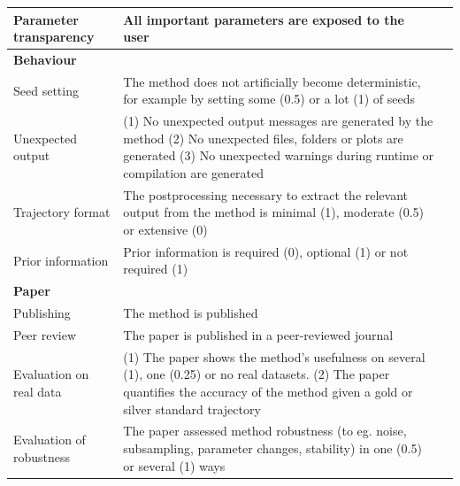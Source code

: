 \begin{table}
\begin{tabular}{p{3.5cm}p{9cm}p{2.5cm}}
		Parameter transparency & All important parameters are exposed to the user & \cite{taschuk_tensimplerules_2017}\\
		
		\midrule
		\multicolumn{3}{l}{\textbf{Behaviour}} \\*
		
		Seed setting & The method does not artificially become deterministic, for example by setting some (0.5) or a lot (1) of seeds & \cite{puget_greendiceare_2016}\\*
		
		Unexpected output & (1) No unexpected output messages are generated by the method (2) No unexpected files, folders or plots are generated (3) No unexpected warnings during runtime or compilation are generated & \cite{artaza_top10metrics_2016}\\*
		
		Trajectory format & The postprocessing necessary to extract the relevant output from the method is minimal (1), moderate (0.5) or extensive (0) & \\*
		
		Prior information & Prior information is required (0), optional (1) or not required (1) & \\*
		
		\midrule
		\multicolumn{3}{l}{\textbf{Paper}} \\*
		
		Publishing & The method is published & \\*
		
		Peer review & The paper is published in a peer-reviewed journal & \cite{karimzadeh_topconsiderationscreating_,gannon_essentialrolepeer_2001,baldwin_refereeswetrust_2017}\\*
		
		Evaluation on real data & (1) The paper shows the method's usefulness on several (1), one (0.25) or no real datasets. (2) The paper quantifies the accuracy of the method given a gold or silver standard trajectory & \cite{aniba_issuesbioinformaticsbenchmarking_2010,jelizarow_overoptimismbioinformaticsillustration_2010}\\*
		
		Evaluation of robustness & The paper assessed method robustness (to eg. noise, subsampling, parameter changes, stability) in one (0.5) or several (1) ways & \cite{karimzadeh_topconsiderationscreating_,aniba_issuesbioinformaticsbenchmarking_2010,boulesteix_tensimplerules_2015,jelizarow_overoptimismbioinformaticsillustration_2010}\\
		
		\bottomrule
	\end{tabular}
	\endgroup{}
\end{table}

